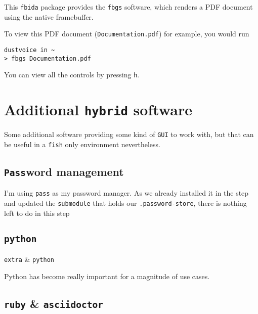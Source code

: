 \documentclass[10pt]{dustdoc}
\begin{document}
This \texttt{fbida} package provides the \texttt{fbgs} software, which renders a PDF document using the native framebuffer.

To view this PDF document (\texttt{Documentation.pdf}) for example, you would run

\begin{verbatim}
dustvoice in ~
> fbgs Documentation.pdf
\end{verbatim}


\begin{NOTE}
    You can view all the controls by pressing \texttt{h}.
\end{NOTE}

\section{Additional \texttt{hybrid} software}%
\label{sec:additional-hybrid-software}

Some additional software providing some kind of \texttt{GUI} to work with, but that can be useful in a \texttt{fish} only environment nevertheless.

\subsection{\texttt{Pass}word management}%
\label{sec:password-management}

I’m using \texttt{pass} as my password manager.
As we already installed it in the  step and updated the \texttt{submodule} that holds our \texttt{.password-store}, there is nothing left to do in this step

\subsection{\texttt{python}}%
\label{sec:python}

\begin{pkgtable}
    \texttt{extra} & \texttt{python} \\
\end{pkgtable}

Python has become really important for a magnitude of use cases.

\subsection{\texttt{ruby} \& \texttt{asciidoctor}}%
\label{sec:ruby-and-asciidoctor}
\end{document}
